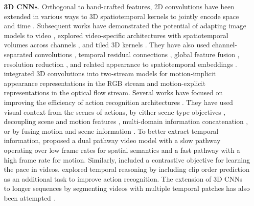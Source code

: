 \noindent
\textbf{3D CNNs}. Orthogonal to hand-crafted features, 2D convolutions have been extended in various ways to 3D spatiotemporal kernels to jointly encode space and time . Subsequent works have demonstrated the potential of adapting image models to video , explored video-specific architectures with spatiotemporal volumes across channels , and tiled 3D kernels . They have also used channel-separated convolutions , temporal residual connections , global feature fusion , resolution reduction , and related appearance to spatiotemporal embeddings .  integrated 3D convolutions into two-stream models for motion-implicit appearance representations in the RGB stream and motion-explicit representations in the optical flow stream. Several works have focused on improving the efficiency of action recognition architectures . They have used visual context from the scenes of actions, by either scene-type objectives , decoupling scene and motion features , multi-domain information concatenation , or by fusing motion and scene information . To better extract temporal information,  proposed a dual pathway video model with a slow pathway operating over low frame rates for spatial semantics and a fast pathway with a high frame rate for motion. Similarly,  included a contrastive objective for learning the pace in videos.  explored temporal reasoning by including clip order prediction as an additional task to improve action recognition. The extension of 3D CNNs to longer sequences by segmenting videos with multiple temporal patches has also been attempted .

